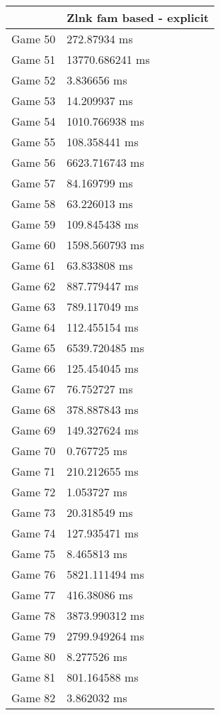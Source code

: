\begin{tabular}{|l|l|}
	\hline
	& Zlnk fam based - explicit \\ \hline
	Game 50 & 272.87934 ms \\ \hline
	Game 51 & 13770.686241 ms \\ \hline
	Game 52 & 3.836656 ms \\ \hline
	Game 53 & 14.209937 ms \\ \hline
	Game 54 & 1010.766938 ms \\ \hline
	Game 55 & 108.358441 ms \\ \hline
	Game 56 & 6623.716743 ms \\ \hline
	Game 57 & 84.169799 ms \\ \hline
	Game 58 & 63.226013 ms \\ \hline
	Game 59 & 109.845438 ms \\ \hline
	Game 60 & 1598.560793 ms \\ \hline
	Game 61 & 63.833808 ms \\ \hline
	Game 62 & 887.779447 ms \\ \hline
	Game 63 & 789.117049 ms \\ \hline
	Game 64 & 112.455154 ms \\ \hline
	Game 65 & 6539.720485 ms \\ \hline
	Game 66 & 125.454045 ms \\ \hline
	Game 67 & 76.752727 ms \\ \hline
	Game 68 & 378.887843 ms \\ \hline
	Game 69 & 149.327624 ms \\ \hline
	Game 70 & 0.767725 ms \\ \hline
	Game 71 & 210.212655 ms \\ \hline
	Game 72 & 1.053727 ms \\ \hline
	Game 73 & 20.318549 ms \\ \hline
	Game 74 & 127.935471 ms \\ \hline
	Game 75 & 8.465813 ms \\ \hline
	Game 76 & 5821.111494 ms \\ \hline
	Game 77 & 416.38086 ms \\ \hline
	Game 78 & 3873.990312 ms \\ \hline
	Game 79 & 2799.949264 ms \\ \hline
	Game 80 & 8.277526 ms \\ \hline
	Game 81 & 801.164588 ms \\ \hline
	Game 82 & 3.862032 ms \\ \hline

\end{tabular}
